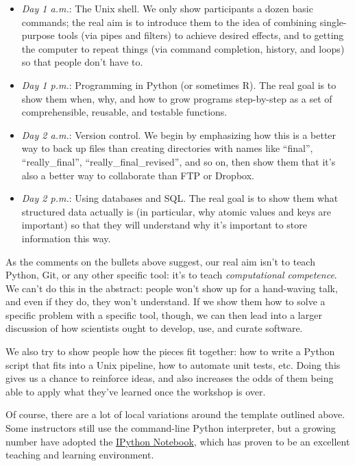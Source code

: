 \documentclass[10pt,a4paper,twocolumn]{article}
\begin{document}
\begin{itemize}
\item
  \emph{Day 1 a.m.}: The Unix shell. We only show participants a dozen
  basic commands; the real aim is to introduce them to the idea of
  combining single-purpose tools (via pipes and filters) to achieve
  desired effects, and to getting the computer to repeat things (via
  command completion, history, and loops) so that people don't have
  to.
\item
  \emph{Day 1 p.m.}: Programming in Python (or sometimes R). The real
  goal is to show them when, why, and how to grow programs
  step-by-step as a set of comprehensible, reusable, and testable
  functions.
\item
  \emph{Day 2 a.m.}: Version control. We begin by emphasizing how this
  is a better way to back up files than creating directories with names
  like ``final'', ``really\_final'', ``really\_final\_revised'', and
  so on, then show them that it's also a better way to collaborate
  than FTP or Dropbox.
\item
  \emph{Day 2 p.m.}: Using databases and SQL.  The real goal is to
  show them what structured data actually is (in particular, why
  atomic values and keys are important) so that they will understand
  why it's important to store information this way.
\end{itemize}

As the comments on the bullets above suggest, our real aim isn't to
teach Python, Git, or any other specific tool: it's to teach
\emph{computational competence}. We can't do this in the abstract:
people won't show up for a hand-waving talk, and even if they do, they
won't understand. If we show them how to solve a specific problem with
a specific tool, though, we can then lead into a larger discussion of
how scientists ought to develop, use, and curate software.

We also try to show people how the pieces fit together: how to write a
Python script that fits into a Unix pipeline, how to automate unit
tests, etc. Doing this gives us a chance to reinforce ideas, and also
increases the odds of them being able to apply what they've learned
once the workshop is over.

Of course, there are a lot of local variations around the template
outlined above. Some instructors still use the command-line Python
interpreter, but a growing number have adopted the
\href{http://ipython.org/notebook.html}{IPython Notebook}, which has
proven to be an excellent teaching and learning environment.
\end{document}
